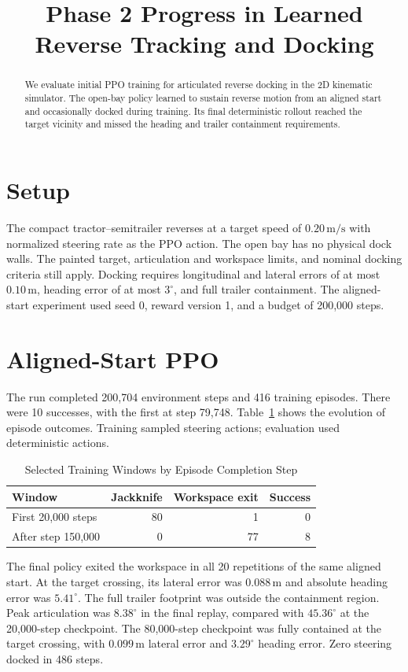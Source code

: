 \documentclass[conference]{IEEEtran}
\title{Phase 2 Progress in Learned Reverse Tracking and Docking}
\author{
  \IEEEauthorblockN{Nandan Prince}
  \IEEEauthorblockA{MSML 642}
  \and
  \IEEEauthorblockN{Chris Pedretti}
  \IEEEauthorblockA{MSML 642}
}
\begin{document}
\maketitle

\begin{abstract}
We evaluate initial PPO training for articulated reverse docking in the 2D
kinematic simulator. The open-bay policy learned to sustain reverse motion
from an aligned start and occasionally docked during training. Its final
deterministic rollout reached the target vicinity and missed the heading and
trailer containment requirements.
\end{abstract}

\section{Setup}
The compact tractor--semitrailer reverses at a target speed of
$0.20\,\mathrm{m/s}$ with normalized steering rate as the PPO action. The
open bay has no physical dock walls. The painted target, articulation and
workspace limits, and nominal docking criteria still apply. Docking requires
longitudinal and lateral errors of at most $0.10\,\mathrm{m}$, heading error
of at most $3^\circ$, and full trailer containment. The aligned-start
experiment used seed 0, reward version 1, and a budget of 200,000 steps.

\section{Aligned-Start PPO}
The run completed 200,704 environment steps and 416 training episodes.
There were 10 successes, with the first at step 79,748.
Table~\ref{tab:training} shows the evolution of episode outcomes.
Training sampled steering actions; evaluation used deterministic actions.

\begin{table}[ht]
\caption{Selected Training Windows by Episode Completion Step}
\label{tab:training}
\centering
\begin{tabular}{lrrr}
\toprule
Window & Jackknife & Workspace exit & Success \\
\midrule
First 20,000 steps & 80 & 1 & 0 \\
After step 150,000 & 0 & 77 & 8 \\
\bottomrule
\end{tabular}
\end{table}

The final policy exited the workspace in all 20 repetitions of the same
aligned start. At the target crossing, its lateral error was
$0.088\,\mathrm{m}$ and absolute heading error was $5.41^\circ$. The full
trailer footprint was outside the containment region. Peak articulation
was $8.38^\circ$ in the final replay, compared with $45.36^\circ$ at the
20,000-step checkpoint. The 80,000-step checkpoint was fully contained at
the target crossing, with $0.099\,\mathrm{m}$ lateral error and
$3.29^\circ$ heading error. Zero steering docked in 486 steps.
\end{document}
